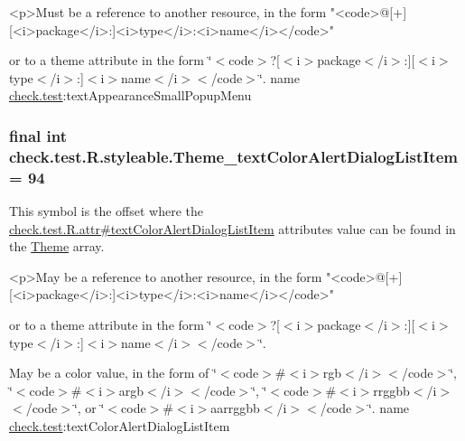 \begin{DoxyVerb}      <p>Must be a reference to another resource, in the form "<code>@[+][<i>package</i>:]<i>type</i>:<i>name</i></code>"
\end{DoxyVerb}
 or to a theme attribute in the form \char`\"{}$<$code$>$?\mbox{[}$<$i$>$package$<$/i$>$\+:\mbox{]}\mbox{[}$<$i$>$type$<$/i$>$\+:\mbox{]}$<$i$>$name$<$/i$>$$<$/code$>$\char`\"{}.  name \hyperlink{namespacecheck_1_1test}{check.\+test}\+:text\+Appearance\+Small\+Popup\+Menu \hypertarget{classcheck_1_1test_1_1_r_1_1styleable_a1c80e17e0c7244efe703fdaec5710c66}{}
\subsubsection[{Theme\+\_\+text\+Color\+Alert\+Dialog\+List\+Item}]{\setlength{\rightskip}{0pt plus 5cm}final int check.\+test.\+R.\+styleable.\+Theme\+\_\+text\+Color\+Alert\+Dialog\+List\+Item = 94\hspace{0.3cm}{\ttfamily [static]}}\label{classcheck_1_1test_1_1_r_1_1styleable_a1c80e17e0c7244efe703fdaec5710c66}
This symbol is the offset where the \hyperlink{classcheck_1_1test_1_1_r_1_1attr_a425298cc593c901237a84e3e18629040}{check.\+test.\+R.\+attr\#text\+Color\+Alert\+Dialog\+List\+Item} attribute\textquotesingle{}s value can be found in the \hyperlink{classcheck_1_1test_1_1_r_1_1styleable_acca726d02016a0cf607782ec3a436a81}{Theme} array.

\begin{DoxyVerb}      <p>May be a reference to another resource, in the form "<code>@[+][<i>package</i>:]<i>type</i>:<i>name</i></code>"
\end{DoxyVerb}
 or to a theme attribute in the form \char`\"{}$<$code$>$?\mbox{[}$<$i$>$package$<$/i$>$\+:\mbox{]}\mbox{[}$<$i$>$type$<$/i$>$\+:\mbox{]}$<$i$>$name$<$/i$>$$<$/code$>$\char`\"{}. 

May be a color value, in the form of \char`\"{}$<$code$>$\#$<$i$>$rgb$<$/i$>$$<$/code$>$\char`\"{}, \char`\"{}$<$code$>$\#$<$i$>$argb$<$/i$>$$<$/code$>$\char`\"{}, \char`\"{}$<$code$>$\#$<$i$>$rrggbb$<$/i$>$$<$/code$>$\char`\"{}, or \char`\"{}$<$code$>$\#$<$i$>$aarrggbb$<$/i$>$$<$/code$>$\char`\"{}.  name \hyperlink{namespacecheck_1_1test}{check.\+test}\+:text\+Color\+Alert\+Dialog\+List\+Item \hypertarget{classcheck_1_1test_1_1_r_1_1styleable_ac9bde1fe29dd51a5aa9486cce5dc77cd}{}
